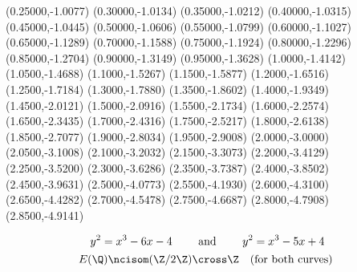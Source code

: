 \documentclass[11pt]{report}
\begin{document}
\begin{center}
  (0.25000,-1.0077)
  (0.30000,-1.0134)
  (0.35000,-1.0212)
  (0.40000,-1.0315)
  (0.45000,-1.0445)
  (0.50000,-1.0606)
  (0.55000,-1.0799)
  (0.60000,-1.1027)
  (0.65000,-1.1289)
  (0.70000,-1.1588)
  (0.75000,-1.1924)
  (0.80000,-1.2296)
  (0.85000,-1.2704)
  (0.90000,-1.3149)
  (0.95000,-1.3628)
  (1.0000,-1.4142)
  (1.0500,-1.4688)
  (1.1000,-1.5267)
  (1.1500,-1.5877)
  (1.2000,-1.6516)
  (1.2500,-1.7184)
  (1.3000,-1.7880)
  (1.3500,-1.8602)
  (1.4000,-1.9349)
  (1.4500,-2.0121)
  (1.5000,-2.0916)
  (1.5500,-2.1734)
  (1.6000,-2.2574)
  (1.6500,-2.3435)
  (1.7000,-2.4316)
  (1.7500,-2.5217)
  (1.8000,-2.6138)
  (1.8500,-2.7077)
  (1.9000,-2.8034)
  (1.9500,-2.9008)
  (2.0000,-3.0000)
  (2.0500,-3.1008)
  (2.1000,-3.2032)
  (2.1500,-3.3073)
  (2.2000,-3.4129)
  (2.2500,-3.5200)
  (2.3000,-3.6286)
  (2.3500,-3.7387)
  (2.4000,-3.8502)
  (2.4500,-3.9631)
  (2.5000,-4.0773)
  (2.5500,-4.1930)
  (2.6000,-4.3100)
  (2.6500,-4.4282)
  (2.7000,-4.5478)
  (2.7500,-4.6687)
  (2.8000,-4.7908)
  (2.8500,-4.9141)
  \endpspicture
\end{center}

{\large$$y^2 = x^3 - 6x - 4\qquad\text{ and }\qquad{}y^2 = x^3 - 5x + 4\vspace{-3ex}$$}
{\large$$E(\Q)\ncisom (\Z/2\Z) \cross\Z\quad \text{(for both curves) }$$}
\end{document}
